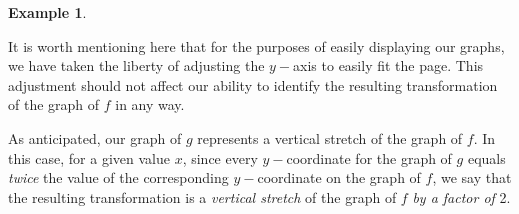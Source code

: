 \documentclass[12pt]{book}
\theoremstyle{definition}
\newtheorem{example}{Example}
\begin{document}
\begin{example}
\begin{multicols}{2}
\begin{center}
\end{center} 
\end{multicols}
It is worth mentioning here that for the purposes of easily displaying our graphs, we have taken the liberty of adjusting the $y-$axis to easily fit the page.  This adjustment should not affect our ability to identify the resulting transformation of the graph of $f$ in any way.\par
As anticipated, our graph of $g$ represents a vertical stretch of the graph of $f$.  In this case, for a given value $x$, since every $y-$coordinate for the graph of $g$ equals {\it twice} the value of the corresponding $y-$coordinate on the graph of $f$, we say that the resulting transformation is a {\it vertical stretch} of the graph of $f$ {\it by a factor of} 2. 
\end{example}
\end{document}
